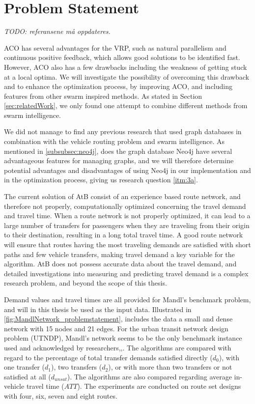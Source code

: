 \section{Problem Statement}
\label{sec:problemStatement}

\emph{\color{blue} TODO: referansene må oppdateres.}

ACO has several advantages for the VRP, such as natural parallelism and continuous positive feedback, which allows good solutions to be identified fast. However, ACO also has a few drawbacks including the weakness of getting stuck at a local optima. We will investigate the possibility of overcoming this drawback and to enhance the optimization process, by improving ACO, and including features from other swarm inspired methods. As stated in Section \vref{sec:relatedWork}, we only found one attempt to combine different methods from swarm intelligence.%

We did not manage to find any previous research that used graph databases in combination with the vehicle routing problem and swarm intelligence. As mentioned in \vref{subsubsec:neo4j}, does the graph database Neo4j \citep{website:neo4j} have several advantageous features for managing graphs, and we will therefore determine potential advantages and disadvantages of using Neo4j in our implementation and in the optimization process, giving us research question \vref{itm:3a}.

The current solution of AtB consist of an experience based route network, and therefore not properly, computationally optimized concerning the travel demand and travel time. When a route network is not properly optimized, it can lead to a large number of transfers for passengers when they are traveling from their origin to their destination, resulting in a long total travel time. A good route network will ensure that routes having the most traveling demands are satisfied with short paths and few vehicle transfers, making travel demand a key variable for the algorithm. AtB\citep{website:atb} does not possess accurate data about the travel demand, and detailed investigations into measuring and predicting travel demand is a complex research problem, and beyond the scope of this thesis. 

Demand values and travel times are all provided for Mandl's benchmark problem\citep{mandl79}, and will in this thesis be used as the input data. Illustrated in \vref{fig:MandlNetwork_problemstatement}, includes the data a small and dense network with 15 nodes and 21 edges. For the urban transit network design problem (UTNDP), Mandl's network seems to be the only benchmark instance used and acknowledged by researchers\citep{fan09},\citep{kechagiopoulos14},\citep{nikolic14}. The algorithms are compared with regard to the percentage of total transfer demands satisfied directly ($d_0$), with one transfer ($d_1$), two transfers ($d_2$), or with more than two transfers or not satisfied at all ($d_{unsat}$). The algorithms are also compared regarding average in-vehicle travel time ($ATT$). The experiments are conducted on route set designs with four, six, seven and eight routes.

